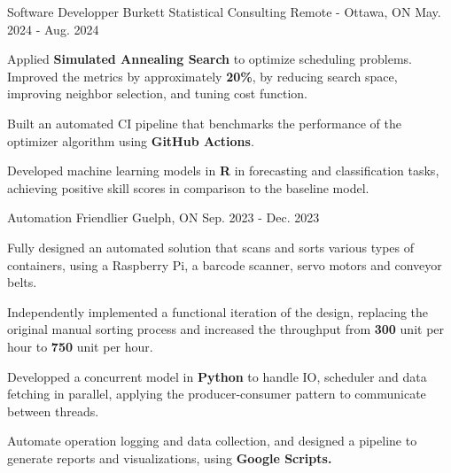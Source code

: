 

\begin{cventries}

\cventry
{Software Developper} %
{Burkett Statistical Consulting} %
{Remote - Ottawa, ON} %
{May. 2024 - Aug. 2024} %
{
  \begin{cvitems} %
    \item {Applied \textbf{Simulated Annealing Search} to optimize scheduling problems. Improved the metrics by approximately \textbf{20\%}, by reducing search space, improving neighbor selection, and tuning cost function.}
    \item {Built an automated CI pipeline that benchmarks the performance of the optimizer algorithm using \textbf{GitHub Actions}.}
    \item {Developed machine learning models in \textbf{R} in forecasting and classification tasks, achieving positive skill scores in comparison to the baseline model.}
  \end{cvitems}
}

\cventry
{Automation} %
{Friendlier} %
{Guelph, ON} %
{Sep. 2023 - Dec. 2023} %
{
  \begin{cvitems} %
    \item {Fully designed an automated solution that scans and sorts various types of containers, using a Raspberry Pi, a barcode scanner, servo motors and conveyor belts.}
    \item {Independently implemented a functional iteration of the design, replacing the original manual sorting process and increased the throughput from \textbf{300} unit per hour to \textbf{750} unit per hour.}
    \item {Developped a concurrent model in \textbf{Python} to handle IO, scheduler and data fetching in parallel, applying the producer-consumer pattern to communicate between threads.}
    \item {Automate operation logging and data collection, and designed a pipeline to generate reports and visualizations, using \textbf{Google Scripts.}}
  \end{cvitems}
}


\end{cventries}
